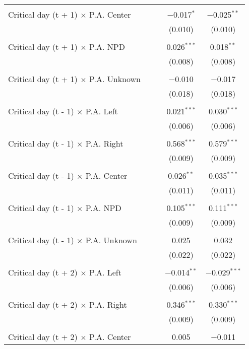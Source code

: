 \documentclass[
]{article}
\begin{document}
\begin{table}[!htbp]
{\begin{tabular}{@{\extracolsep{5pt}}lcccc}
  & & & & \\ 
 Critical day (t + 1) $\times$ P.A. Center &  &  & $-$0.017$^{*}$ & $-$0.025$^{**}$ \\ 
  &  &  & (0.010) & (0.010) \\ 
  & & & & \\ 
 Critical day (t + 1) $\times$ P.A. NPD &  &  & 0.026$^{***}$ & 0.018$^{**}$ \\ 
  &  &  & (0.008) & (0.008) \\ 
  & & & & \\ 
 Critical day (t + 1) $\times$ P.A. Unknown &  &  & $-$0.010 & $-$0.017 \\ 
  &  &  & (0.018) & (0.018) \\ 
  & & & & \\ 
 Critical day (t - 1) $\times$ P.A. Left &  &  & 0.021$^{***}$ & 0.030$^{***}$ \\ 
  &  &  & (0.006) & (0.006) \\ 
  & & & & \\ 
 Critical day (t - 1) $\times$ P.A. Right &  &  & 0.568$^{***}$ & 0.579$^{***}$ \\ 
  &  &  & (0.009) & (0.009) \\ 
  & & & & \\ 
 Critical day (t - 1) $\times$ P.A. Center &  &  & 0.026$^{**}$ & 0.035$^{***}$ \\ 
  &  &  & (0.011) & (0.011) \\ 
  & & & & \\ 
 Critical day (t - 1) $\times$ P.A. NPD &  &  & 0.105$^{***}$ & 0.111$^{***}$ \\ 
  &  &  & (0.009) & (0.009) \\ 
  & & & & \\ 
 Critical day (t - 1) $\times$ P.A. Unknown &  &  & 0.025 & 0.032 \\ 
  &  &  & (0.022) & (0.022) \\ 
  & & & & \\ 
 Critical day (t + 2) $\times$ P.A. Left &  &  & $-$0.014$^{**}$ & $-$0.029$^{***}$ \\ 
  &  &  & (0.006) & (0.006) \\ 
  & & & & \\ 
 Critical day (t + 2) $\times$ P.A. Right &  &  & 0.346$^{***}$ & 0.330$^{***}$ \\ 
  &  &  & (0.009) & (0.009) \\ 
  & & & & \\ 
 Critical day (t + 2) $\times$ P.A. Center &  &  & 0.005 & $-$0.011 \\ 

\end{tabular}}
\end{table}
\end{document}
